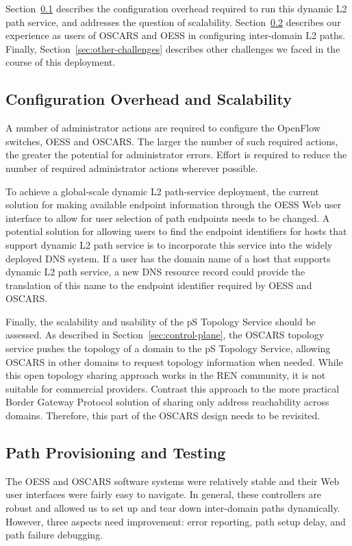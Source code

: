 
Section~\ref{sec:config-ovhd} describes the configuration
overhead required to run this dynamic L2 path service, and addresses
the question of scalability.
Section~\ref{sec:ckt-provisioning} describes
our experience as users of OSCARS and OESS in configuring
inter-domain L2 paths.
Finally, Section~\ref{sec:other-challenges} describes
other challenges we faced in the course of this deployment.

\subsection{Configuration Overhead and Scalability}
\label{sec:config-ovhd}
A number of administrator
actions are required to configure the OpenFlow switches, OESS and OSCARS. The
larger the number of such required actions, the greater the
potential for administrator errors.
Effort is required to reduce the number of required administrator
actions wherever possible.

To achieve a global-scale dynamic L2 path-service deployment,
the current solution for making available endpoint information
through the OESS Web user interface to allow for user selection of path endpoints
needs
to be changed. A potential solution for allowing users to find the
endpoint identifiers for hosts that support dynamic L2 path service is
to incorporate this service into the widely deployed DNS system. If a user
has the domain name of a host that supports dynamic L2 path service, a new DNS
resource record could provide the translation of this name to the endpoint
identifier required by OESS and OSCARS.

Finally, the scalability and usability of the pS Topology Service should be assessed.
As described in Section~\ref{sec:control-plane}, the OSCARS topology service
pushes the topology of a domain to the pS Topology Service, allowing OSCARS
in other domains to request topology information when needed. While this open
topology sharing approach works in the REN community, it is not suitable
for commercial providers. Contrast this approach to the more practical Border Gateway Protocol solution of sharing only address reachability across domains.
Therefore, this part of the OSCARS design needs to be revisited.


\subsection{Path Provisioning and Testing}
\label{sec:ckt-provisioning}

The OESS and OSCARS software systems were relatively stable and their Web user interfaces were fairly easy to navigate. In general, these controllers are
robust and allowed us to set up and tear down inter-domain paths dynamically.
However, three aspects need improvement: error reporting, path setup delay,
and path failure debugging.

